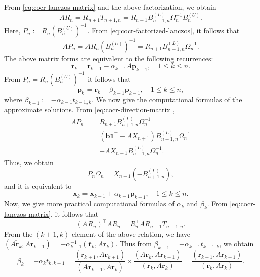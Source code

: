 {From \eqref{eq:cocr-lanczos-matrix} and the above factorization, we obtain}
\begin{equation}\label{eq:cocr-factorized-lanczos}
AR_n=R_{n+1}T_{n+1,n}=R_{n+1}B_{n+1,n}^{(L)}\Omega_n^{-1}B_n^{(U)}.
\end{equation}
{Here, $P_n:=R_n(B_n^{(U)})^{-1}$. From \eqref{eq:cocr-factorized-lanczos}, it follows that}
\begin{equation}\label{eq:cocr-direction-matrix}
AP_n=AR_n(B_n^{(U)})^{-1}=R_{n+1}B_{n+1,n}^{(L)}\Omega_n^{-1}.
\end{equation}
{The above matrix forms are equivalent to the following recurrences:}
\begin{equation}\label{eq:cocr-residual-recurrence}\bm r_k=\bm r_{k-1}-\alpha_{k-1}A\bm p_{k-1},\quad1\le k\le n.\end{equation}
{From $P_n=R_n(B_n^{(U)})^{-1}$ it follows that}
\begin{equation}\label{eq:cocr-direction-recurrence}\bm p_k=\bm r_k+\beta_{k-1}\bm p_{k-1},\quad1\le k\le n,\end{equation}
{where $\beta_{k-1}:=-\alpha_{k-1}t_{k-1,k}$. We now give the computational formulas of the approximate solutions. From \eqref{eq:cocr-direction-matrix},}
\[\begin{aligned}
AP_n&=R_{n+1}B_{n+1,n}^{(L)}\Omega_n^{-1}\\
&=(\bm b\bm1^{\top}-AX_{n+1})B_{n+1,n}^{(L)}\Omega_n^{-1}\\
&=-AX_{n+1}B_{n+1,n}^{(L)}\Omega_n^{-1}.
\end{aligned}\]
{Thus, we obtain}
\[P_n\Omega_n=X_{n+1}(-B_{n+1,n}^{(L)}),\]
{and it is equivalent to}
\begin{equation}\label{eq:cocr-solution-recurrence}\bm x_k=\bm x_{k-1}+\alpha_{k-1}\bm p_{k-1},\quad1\le k\le n.\end{equation}
{Now, we give more practical computational formulas of $\alpha_k$ and $\beta_k$. From \eqref{eq:cocr-lanczos-matrix}, it follows that}
\[(AR_n)^{\top}AR_n=R_n^{\top}AR_{n+1}T_{n+1,n}.\]
{From the $(k+1,k)$ element of the above relation, we have $(\overline{A\bm r_k},A\bm r_{k-1})=-\alpha_{k-1}^{-1}(\bar{\bm r}_k,A\bm r_k)$. Thus from $\beta_{k-1}=-\alpha_{k-1}t_{k-1,k}$, we obtain}
\begin{equation}\label{eq:cocr-beta}
\beta_k=-\alpha_kt_{k,k+1}=\frac{(\bar{\bm r}_{k+1},A\bm r_{k+1})}{(\overline{A\bm r_{k+1}},A\bm r_k)}\times\frac{(\overline{A\bm r_k},A\bm r_{k+1})}{(\bar{\bm r}_k,A\bm r_k)}=\frac{(\bar{\bm r}_{k+1},A\bm r_{k+1})}{(\bar{\bm r}_k,A\bm r_k)}.
\end{equation}
